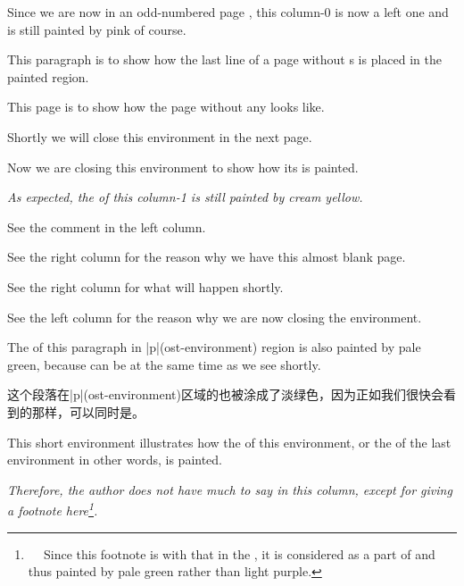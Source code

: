 \begin{paracol}{2}
Since we are now in an odd-numbered page \pageref{page:bgpaint2}, this
column-0 is now a left one and is still painted by pink of course.
\par\vfill\label{page:bgpaint2}

This paragraph is to show how the last line of a page without \Scfnote{}s
is placed in the painted region.
\par\newpage

This page is to show how the page without any \pwstuff{} looks like.
\par\vfill

Shortly we will close this  environment in the next page.
\par\newpage

Now we are closing this  environment to show how its
\postenv{} is painted.

\switchcolumn
\begingroup\it
As expected, the \bground{} of this column-1 is still painted by cream
yellow.
\par\vfill

See the comment in the left column.
\par\newpage

See the right column for the reason why we have this almost blank page.
\par\vfill

See the right column for what will happen shortly.
\par\newpage

See the left column for the reason why we are now closing the environment.
\endgroup
\end{paracol}
\bigskip

The \bground{} of this paragraph in |p|(ost-environment) region is also
painted by pale green, because \postenv{} can be \preenv{} at the same
time as we see shortly.  

这个段落在|p|(ost-environment)区域的\bground{}也被涂成了淡绿色，因为正如我们很快会看到的那样，\postenv{}可以同时是\preenv{}。\par\bigskip

\begin{paracol}{2}
This short  environment illustrates how the \preenv{} of this
environment, or the \postenv{} of the last environment in other words, is
painted.

\switchcolumn
\begingroup\it
Therefore, the author does not have much to say in this column, except for
giving a footnote here\footnote{

Since this footnote is \mgfnote{} with that in the \postenv{}, it is
considered as a part of \postenv{} and thus painted by pale green rather
than light purple.\label{fn:bgpaint1}}.
\endgroup
\end{paracol}
\bigskip


